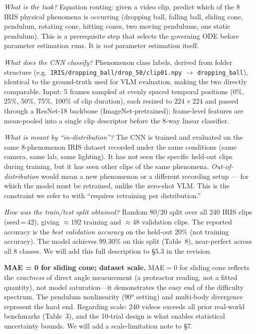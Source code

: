 \documentclass[10pt,twocolumn,letterpaper]{article}
\begin{document}
\noindent\textit{What is the task?} Equation routing: given a video clip, predict which of the 8 IRIS physical phenomena is occurring (dropping ball, falling ball, sliding cone, pendulum, rotating cone, hitting cones, two moving pendulums, one static pendulum). This is a prerequisite step that selects the governing ODE before parameter estimation runs. It is \emph{not} parameter estimation itself.

\noindent\textit{What does the CNN classify?} Phenomenon class labels, derived from folder structure (e.g.\ \texttt{IRIS/dropping\_ball/drop\_50/clip01.npy} $\to$ \texttt{dropping\_ball}), identical to the ground-truth used for VLM evaluation, making the two directly comparable. Input: 5 frames sampled at evenly spaced temporal positions (0\%, 25\%, 50\%, 75\%, 100\% of clip duration), each resized to $224{\times}224$ and passed through a ResNet-18 backbone (ImageNet-pretrained); frame-level features are mean-pooled into a single clip descriptor before the 8-way linear classifier.

\noindent\textit{What is meant by ``in-distribution''?} The CNN is trained and evaluated on the same 8-phenomenon IRIS dataset recorded under the same conditions (same camera, same lab, same lighting). It has not seen the specific held-out clips during training, but it has seen other clips of the same phenomena. \emph{Out-of-distribution} would mean a new phenomenon or a different recording setup — for which the model must be retrained, unlike the zero-shot VLM. This is the constraint we refer to with ``requires retraining per distribution.''

\noindent\textit{How was the train/test split obtained?} Random 80/20 split over all 240 IRIS clips (seed\,=\,42), giving ${\approx}192$ training and ${\approx}48$ validation clips. The reported accuracy is the \emph{best validation accuracy} on the held-out 20\% (not training accuracy). The model achieves $99.30\%$ on this split (Table~8), near-perfect across all 8 classes. We will add this full description to \S5.3 in the revision.

\noindent\textbf{MAE = 0 for sliding cone; dataset scale.}
MAE$=0$ for sliding cone reflects the \emph{exactness} of direct angle measurement (a protractor reading, not a fitted quantity), not model saturation—it demonstrates the easy end of the difficulty spectrum. The pendulum nonlinearity ($90°$ setting) and multi-body divergence represent the hard end. Regarding scale: 240 videos exceeds all prior real-world benchmarks (Table~3), and the 10-trial design is what enables statistical uncertainty bounds. We will add a scale-limitation note to \S7.
\end{document}
